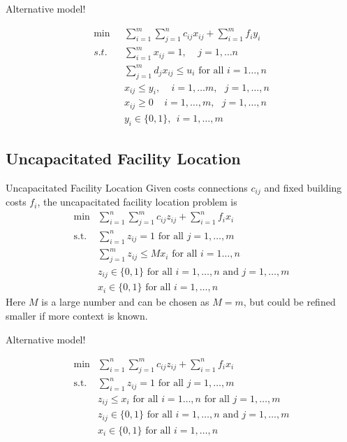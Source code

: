 Alternative model!

\begin{align*}
\min \ \ \ & \sum_{i = 1}^m\sum_{j=1}^n c_{ij}x_{ij}+\sum_{i = 1}^mf_iy_i\\
s.t.&  \sum_{i = 1}^mx_{ij} = 1,~~~~~j =1,\ldots n\\
& \displaystyle \sum_{j=1}^md_jx_{ij}\leqslant u_i\text{ for all }i=1\dots,n \tag{capacity of facility $i$}\\
&x_{ij}\leq y_i,~~~~~ i = 1,\ldots m,~~~ j = 1,\ldots,n\\
&  x_{ij} \geq 0~~~~~ i = 1,\ldots,m, ~~~j = 1,\ldots,n\\
& y_i\in \{0,1\}, \  \  i = 1,\ldots,m
\end{align*}

\subsection{Uncapacitated Facility Location}
\begin{general}{Uncapacitated Facility Location}{\npcomplete}
Given costs connections $c_{ij}$ and fixed building costs $f_i$, the uncapacitated facility location problem is 
\begin{equation}
\begin{array}{rl}
\min & \displaystyle\sum_{i=1}^n\sum_{j=1}^mc_{ij}z_{ij}+\sum_{i=1}^nf_ix_i \\
\text{s.t.} & \displaystyle\sum_{i=1}^nz_{ij}=1 \text{ for all }j=1,\dots,m \\
& \displaystyle \sum_{j=1}^mz_{ij}\leqslant Mx_i\text{ for all }i=1\dots,n \\
&z_{ij}\in\{0,1\}\text{ for all }i=1,\dots,n \text{ and }j=1,\dots,m\\
&x_i\in\{0,1\}\text{ for all } i=1,\dots,n
\end{array}
\end{equation}
Here $M$ is a large number and can be chosen as $M = m$, but could be refined smaller if more context is known.
\end{general}

Alternative model!

\begin{equation}
\begin{array}{rl}
\min & \displaystyle\sum_{i=1}^n\sum_{j=1}^mc_{ij}z_{ij}+\sum_{i=1}^nf_ix_i \\
\text{s.t.} & \displaystyle\sum_{i=1}^nz_{ij}=1 \text{ for all }j=1,\dots,m \\
& z_{ij}\leqslant x_i\text{ for all }i=1\dots,n \text{ for all } j = 1, \dots, m \\
&z_{ij}\in\{0,1\}\text{ for all }i=1,\dots,n \text{ and }j=1,\dots,m\\
&x_i\in\{0,1\}\text{ for all } i=1,\dots,n
\end{array}
\end{equation}
\newpage
